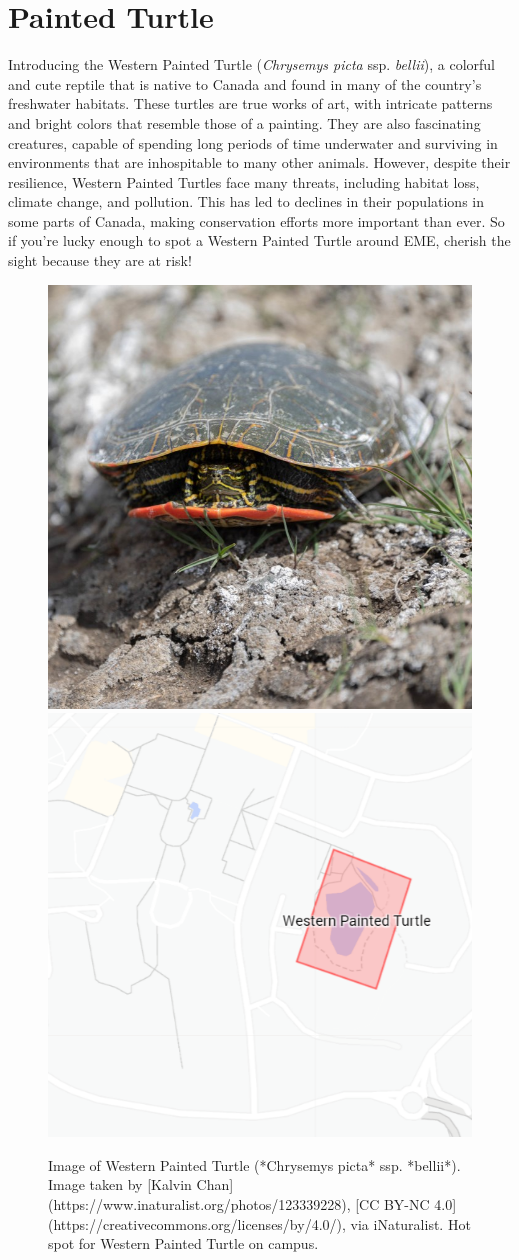 \documentclass[
]{book}
\begin{document}
\hypertarget{painted-turtle}{%
\section{Painted Turtle}\label{painted-turtle}}

Introducing the Western Painted Turtle (\emph{Chrysemys picta} ssp. \emph{bellii}), a colorful and cute reptile that is native to Canada and found in many of the country's freshwater habitats. These turtles are true works of art, with intricate patterns and bright colors that resemble those of a painting. They are also fascinating creatures, capable of spending long periods of time underwater and surviving in environments that are inhospitable to many other animals. However, despite their resilience, Western Painted Turtles face many threats, including habitat loss, climate change, and pollution. This has led to declines in their populations in some parts of Canada, making conservation efforts more important than ever. So if you're lucky enough to spot a Western Painted Turtle around EME, cherish the sight because they are at risk!

\begin{figure}

{\centering \includegraphics[width=0.49\linewidth,height=0.2\textheight]{animal_images/turt_11} \includegraphics[width=0.49\linewidth,height=0.2\textheight]{animal_images/turt_hotspot_11} 

}

\caption{Image of Western Painted Turtle (*Chrysemys picta* ssp. *bellii*). Image taken by [Kalvin Chan](https://www.inaturalist.org/photos/123339228), [CC BY-NC 4.0](https://creativecommons.org/licenses/by/4.0/), via iNaturalist. Hot spot for Western Painted Turtle on campus.}\label{fig:unnamed-chunk-4}
\end{figure}
\end{document}
